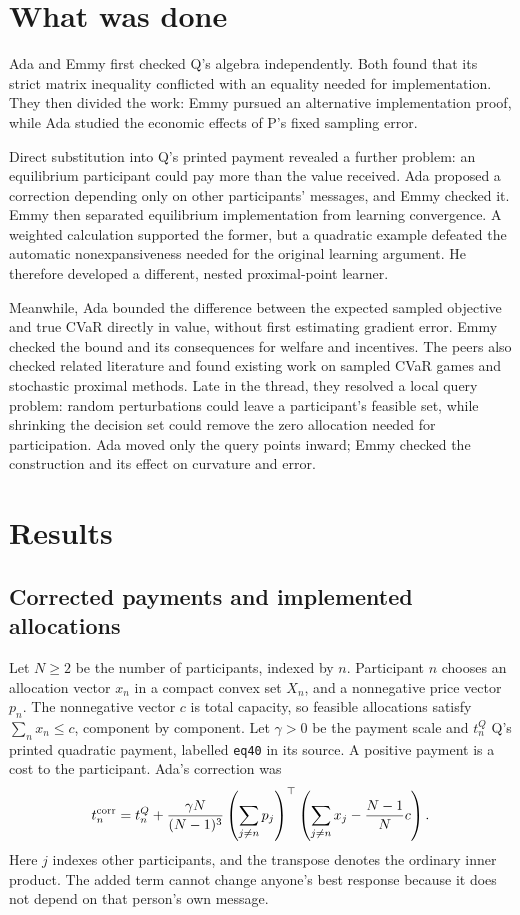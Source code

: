 \documentclass{article}
\begin{document}
\section{What was done}
Ada and Emmy first checked Q's algebra independently.
Both found that its strict matrix inequality conflicted with an equality needed for implementation.
They then divided the work: Emmy pursued an alternative implementation proof, while Ada studied the economic
effects of P's fixed sampling error.

Direct substitution into Q's printed payment revealed a further problem: an equilibrium participant could pay more than the value received.
Ada proposed a correction depending only on other participants' messages, and Emmy checked it.
Emmy then separated equilibrium implementation from learning convergence.
A weighted calculation supported the former, but a quadratic example defeated the automatic nonexpansiveness
needed for the original learning argument.
He therefore developed a different, nested proximal-point learner.

Meanwhile, Ada bounded the difference between the expected sampled objective and true CVaR directly in value,
without first estimating gradient error.
Emmy checked the bound and its consequences for welfare and incentives.
The peers also checked related literature and found existing work on sampled CVaR games and stochastic proximal methods.
Late in the thread, they resolved a local query problem: random perturbations could leave a participant's
feasible set, while shrinking the decision set could remove the zero allocation needed for participation.
Ada moved only the query points inward; Emmy checked the construction and its effect on curvature and error.

\section{Results}
\subsection{Corrected payments and implemented allocations}
Let \(N\ge2\) be the number of participants, indexed by \(n\).
Participant \(n\) chooses an allocation vector \(x_n\) in a compact convex set \(X_n\), and a nonnegative price vector \(p_n\).
The nonnegative vector \(c\) is total capacity, so feasible allocations satisfy \(\sum_n x_n\le c\), component by component.
Let \(\gamma>0\) be the payment scale and \(t_n^Q\) Q's printed quadratic payment, labelled \texttt{eq40} in its source.
A positive payment is a cost to the participant.
Ada's correction was
\[
 t_n^{\rm corr}=t_n^Q+
 \frac{\gamma N}{(N-1)^3}
 \left(\sum_{j\ne n}p_j\right)^\top
 \left(\sum_{j\ne n}x_j-\frac{N-1}{N}c\right).
\]
Here \(j\) indexes other participants, and the transpose denotes the ordinary inner product.
The added term cannot change anyone's best response because it does not depend on that person's own message.
\end{document}
